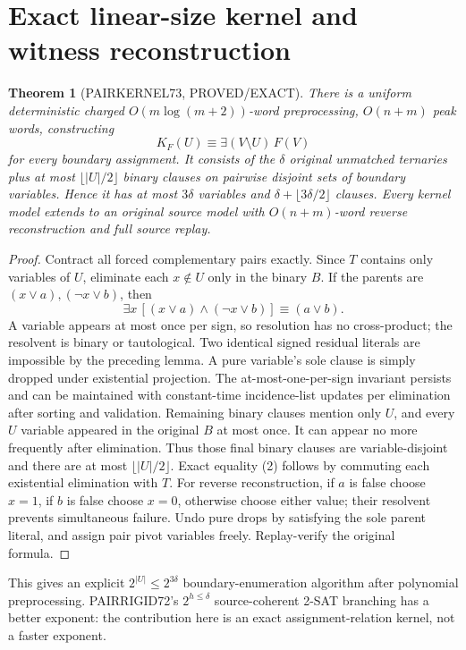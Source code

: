 \documentclass[11pt]{article}
\newtheorem{theorem}{Theorem}
\begin{document}
\section{Exact linear-size kernel and witness reconstruction}
\begin{theorem}[PAIRKERNEL73, PROVED/EXACT]
There is a uniform deterministic charged $O(m\log(m+2))$-word preprocessing, $O(n+m)$ peak words, constructing
\[
K_F(U)\equiv \exists(V\setminus U)\,F(V)
\tag{2}
\]
for every boundary assignment. It consists of the $\delta$ original unmatched ternaries plus at most $\lfloor |U|/2\rfloor$ binary clauses on pairwise disjoint sets of boundary variables. Hence it has at most $3\delta$ variables and $\delta+\lfloor3\delta/2\rfloor$ clauses. Every kernel model extends to an original source model with $O(n+m)$-word reverse reconstruction and full source replay.
\end{theorem}
\begin{proof}
Contract all forced complementary pairs exactly. Since $T$ contains only variables of $U$, eliminate each $x\notin U$ only in the binary $B$. If the parents are $(x\vee a),(\neg x\vee b)$, then
\[
\exists x\,[(x\vee a)\wedge(\neg x\vee b)]\equiv(a\vee b).
\tag{3}
\]
A variable appears at most once per sign, so resolution has no cross-product; the resolvent is binary or tautological. Two identical signed residual literals are impossible by the preceding lemma. A pure variable's sole clause is simply dropped under existential projection. The at-most-one-per-sign invariant persists and can be maintained with constant-time incidence-list updates per elimination after sorting and validation. Remaining binary clauses mention only $U$, and every $U$ variable appeared in the original $B$ at most once. It can appear no more frequently after elimination. Thus those final binary clauses are variable-disjoint and there are at most $\lfloor |U|/2\rfloor$. Exact equality (2) follows by commuting each existential elimination with $T$.
For reverse reconstruction, if $a$ is false choose $x=1$, if $b$ is false choose $x=0$, otherwise choose either value; their resolvent prevents simultaneous failure. Undo pure drops by satisfying the sole parent literal, and assign pair pivot variables freely. Replay-verify the original formula.
\end{proof}
\noindent This gives an explicit $2^{|U|}\le2^{3\delta}$ boundary-enumeration algorithm after polynomial preprocessing. PAIRRIGID72's $2^{h\le\delta}$ source-coherent 2-SAT branching has a better exponent: the contribution here is an exact assignment-relation kernel, not a faster exponent.
\end{document}
